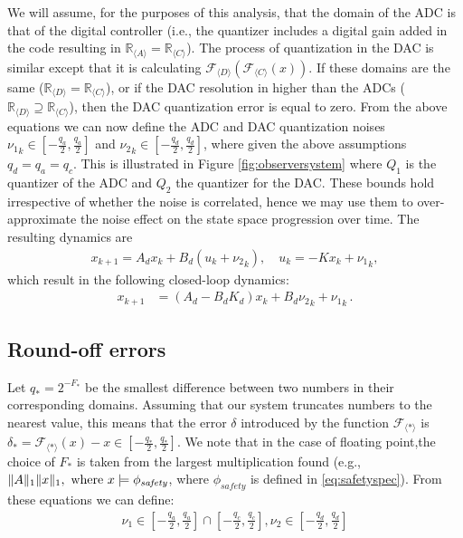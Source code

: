 \documentclass[sigconf]{llncs}
\DeclarePairedDelimiter\norm{\lVert}{\rVert}
\newcommand{\mat}[1]{{#1}}
\renewcommand{\vec}[1]{{#1}}
\begin{document}
We will assume, for the purposes of this analysis, that the domain of the
ADC is that of the digital controller (i.e., the quantizer includes a digital
gain added in the code resulting in $\mathbb{R}_{\langle A
\rangle}=\mathbb{R}_{\langle C \rangle}$).  The process of quantization in
the DAC is similar except that it is calculating $\mathcal{F}_{\langle
D\rangle} (\mathcal{F}_{\langle C \rangle} (x)) $.  If these domains are the
same ($\mathbb{R}_{\langle D \rangle}=\mathbb{R}_{\langle C \rangle}$), or
if the DAC resolution in higher than the ADCs ($\mathbb{R}_{\langle D
\rangle}\supseteq\mathbb{R}_{\langle C \rangle}$), then the DAC quantization
error is equal to zero.  From the above equations we can now define the ADC
and DAC quantization noises ${\nu_1}_k \in [-\frac{q_a}{2}, \frac{q_a}{2}]$
and ${\nu_2}_k \in [-\frac{q_d}{2}, \frac{q_d}{2}]$, where given the above
assumptions $q_d=q_a=q_c$.  This is illustrated in Figure
\ref{fig:observersystem} where $Q_1$ is the quantizer of the ADC and $Q_2$
the quantizer for the DAC.  These bounds hold irrespective of whether the
noise is correlated, hence we may use them to over-approximate the noise
effect on the state space progression over time.  The resulting dynamics are
%
\begin{align*}
\vec{x}_{k+1} = \mat{A}_d\vec{x}_k+\mat{B}_d({u}_k+{{\nu}_2}_k), \quad u_k = -\mat{K}\vec{x}_{k}+{{\nu}_1}_k, 
\end{align*}
%
which result in the following closed-loop dynamics:
%
\begin{align*}
\vec{x}_{k+1} &= (\mat{A}_d-\mat{B}_d\mat{K}_d) \vec{x}_k+\mat{B}_d{{\nu}_2}_k +{{\nu}_1}_k \,. 
\end{align*}

\subsection{Round-off errors}
\label{sec:roundoff-noise}

Let $q_*=2^{-F_*}$ be the smallest difference
between two numbers in their corresponding domains.  Assuming that our
system truncates numbers to the nearest value, this means that the error
$\delta$ introduced by the function $\mathcal{F}_{\langle * \rangle}$ is
$\delta_*=\mathcal{F}_{\langle * \rangle}(x)-x \in \left[-\frac{q_*}{2}, 
\frac{q_*}{2}\right]$.
We note that in the case of floating point,the
choice of $F_*$ is taken from the largest multiplication found (e.g.,
$\norm{\mat{A}}_1\norm{\vec{x}}_1, \text{ where }  \vec{x} \models \phi_\mathit{safety}$,
where $\phi_\mathit{safety}$ is defined in \ref{eq:safetyspec}). From these
equations we can define:
%
\begin{align*}
\nu_1 \in \left[-\frac{q_a}{2}, \frac{q_a}{2}\right] \cap  \left[-\frac{q_c}{2}, \frac{q_c}{2}\right],
\nu_2 \in \left[-\frac{q_d}{2}, \frac{q_d}{2}\right]
\end{align*}
\end{document}
